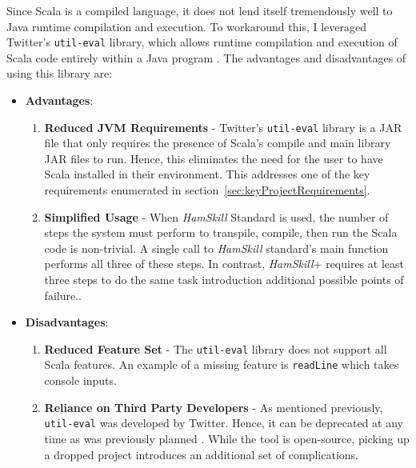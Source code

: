 \documentclass{report}
\begin{document}
Since Scala is a compiled language, it does not lend itself tremendously well to Java runtime compilation and execution.  To workaround this, I leveraged Twitter's \texttt{util-eval} library, which allows runtime compilation and execution of Scala code entirely within a Java program \cite{githubTwitterEvalUtil}.  The advantages and disadvantages of using  this library are:

\begin{itemize}

\item \textbf{Advantages}:

\begin{enumerate}

\item \textbf{Reduced JVM Requirements} - Twitter's \texttt{util-eval} library is a JAR file that only requires the presence of Scala's compile and main library JAR files to run.  Hence, this eliminates the need for the user to have Scala installed in their environment.  This addresses one of the key requirements enumerated in section~\ref{sec:keyProjectRequirements}.

\item \textbf{Simplified Usage} - When \textit{HamSkill} Standard is used, the number of steps the system must perform to transpile, compile, then run the Scala code is non-trivial.  A single call to \textit{HamSkill} standard's main function performs all three of these steps.  In contrast, \textit{HamSkill}+ requires at least three steps to do the same task introduction additional possible points of failure..

\end{enumerate}

\item \textbf{Disadvantages}:

\begin{enumerate}

\item \textbf{Reduced Feature Set} - The \texttt{util-eval} library does not support all Scala features.  An example of a missing feature is \texttt{readLine} which takes console inputs.

\item \textbf{Reliance on Third Party Developers} - As mentioned previously, \texttt{util-eval} was developed by Twitter.  Hence, it can be deprecated at any time as was previously planned \cite{deprecateUtilEval}.  While the tool is open-source, picking up a dropped project introduces an additional set of complications.

\end{enumerate}

\end{itemize}
\end{document}
